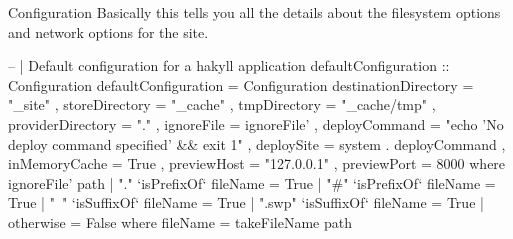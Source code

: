 \documentclass[openany, 12pt]{book}
\begin{document}
\begin{definition}{Configuration}{}
  Basically this tells you all the details about the filesystem options and
  network options for the site.

  \begin{haskell}{}
-- | Default configuration for a hakyll application
defaultConfiguration :: Configuration
defaultConfiguration = Configuration
    { destinationDirectory = "_site"
        , storeDirectory       = "_cache"
        , tmpDirectory         = "_cache/tmp"
        , providerDirectory    = "."
        , ignoreFile           = ignoreFile'
        , deployCommand        = "echo 'No deploy command specified' && exit 1"
        , deploySite           = system . deployCommand
        , inMemoryCache        = True
        , previewHost          = "127.0.0.1"
        , previewPort          = 8000
    }
where
    ignoreFile' path
    | "."    `isPrefixOf` fileName = True
    | "#"    `isPrefixOf` fileName = True
    | "~"    `isSuffixOf` fileName = True
    | ".swp" `isSuffixOf` fileName = True
    | otherwise                    = False
where fileName = takeFileName path
	\end{haskell}
\end{definition}

\printindex{}
\glsaddallunused
\printglossaries
\end{document}
